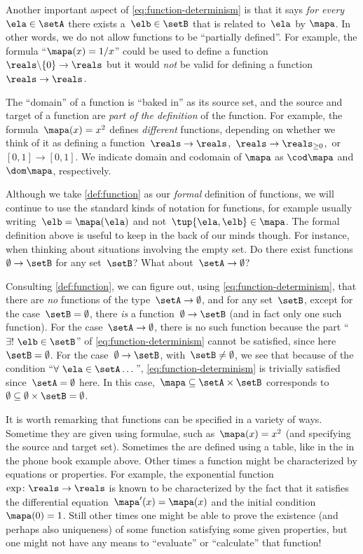 Another important aspect of \cref{eq:function-determinism} is that it says \emph{for every}~$\ela \in \setA$ there exists a~$\elb \in \setB$ that is related to~$\ela$ by $\mapa$.
In other words, we do not allow functions to be ``partially defined''.
For example, the formula ``$\mapa(x) = 1/x$'' could be used to define a function~$\reals \backslash \{ 0 \} \to \reals$ but it would \emph{not} be valid for defining a function~$\reals \to \reals$.

\label{sec:domain-codomain}
The ``domain'' of a function is ``baked in'' as its source set, and the source and target of a function are \emph{part of the definition} of the function. For example, the formula~$\mapa(x) = x^2$ defines \emph{different} functions, depending on whether we think of it as defining a function~$\reals \to \reals$,~$\reals \to \reals_{\geq 0}$,~or $[0,1] \to [0,1]$.
We indicate domain and codomain of $\mapa$ as $\cod\mapa$ and $\dom\mapa$, respectively.


Although we take \cref{def:function} as our \emph{formal} definition of functions, we will continue to use the standard kinds of notation for functions, for example usually writing~$\elb = \mapa(\ela)$ and not~$\tup{\ela, \elb} \in \mapa$.
The formal definition above is useful to keep in the back of our minds though.
For instance, when thinking about situations involving the empty set.
Do there exist functions~$\emptyset \to \setB$ for any set~$\setB$? What about~$\setA \to \emptyset$?

Consulting \cref{def:function}, we can figure out, using \cref{eq:function-determinism}, that there are \emph{no} functions of the type~$\setA \to \emptyset$, and for any set~$\setB$, except for the case~$\setB = \emptyset$, there \emph{is} a function~$\emptyset \to \setB$ (and in fact only one such function).
For the case~$\setA \to \emptyset$, there is no such function because the part ``$\exists ! \ \elb \in \setB$'' of \cref{eq:function-determinism} cannot be satisfied, since here~$\setB = \emptyset$.
For the case~$\emptyset \to \setB$, with~$\setB \neq \emptyset$, we see that because of the condition ``$\forall \ \ela \in \setA \dots$'', \cref{eq:function-determinism} is trivially satisfied since~$\setA = \emptyset$ here.
In this case,~$\mapa \subseteq \setA \times \setB$ corresponds to~$\emptyset \subseteq \emptyset \times \setB = \emptyset$.

It is worth remarking that functions can be specified in a variety of ways.
Sometime they are given using formulae, such as~$\mapa(x)=x^2$ (and specifying the source and target set).
Sometimes the are defined using a table, like in the in the phone book example above.
Other times a function might be characterized by equations or properties.
For example, the exponential function~$\exp \colon \reals \to \reals$ is known to be characterized by the fact that it satisfies the differential equation~$\mapa'(x) = \mapa(x)$ and the initial condition~$\mapa(0) =1$.
Still other times one might be able to prove the existence (and perhaps also uniqueness) of some function satisfying some given properties, but one might not have any means to ``evaluate'' or ``calculate'' that function!

